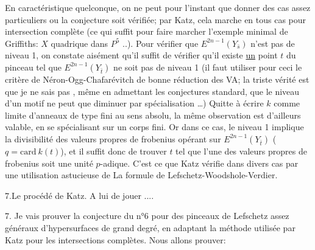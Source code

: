 En caractéristique quelconque, on ne peut pour l'instant que donner des cas assez particuliers ou la conjecture soit vérifiée; par Katz, cela marche en tous cas pour  intersection complète (ce qui suffit pour faire marcher l'exemple minimal de Griffiths: $X$ quadrique dans $P^5$ ..).  Pour vérifier que $E^{2n-1}(Y_{\bar s})$ n'est pas de niveau 1, on constate aisément qu'il suffit de vérifier qu'il existe \uline{un} point $t$ du pinceau tel que $E^{2n-1}(Y_{\bar t})$ ne soit pas de niveau 1 (il faut utiliser pour ceci le critère de Néron-Ogg-Chafarévitch de bonne réduction des VA; la triste vérité est que je ne sais pas , même en  admettant les conjectures standard, que le niveau d'un motif ne peut que diminuer par spécialisation \ldots) Quitte à écrire $k$ comme limite d'anneaux de type fini au sens absolu, la même observation est d'ailleurs valable, en se spécialisant sur un corps fini. Or dans ce cas, le niveau 1 implique la divisibilité  des valeurs propres de frobenius opérant sur $E^{2n-1}(Y_{\bar t})$  ($q=\mathrm{card}\ k(t)$), et il suffit donc de trouver $t$ tel que l'une des valeurs propres de frobenius soit une unité $p$-adique. C'est ce que Katz vérifie dans divers cas par une utilisation astucieuse de La formule de Lefschetz-Woodshole-Verdier.

7.\quad Le procédé de Katz. A lui de jouer ....

7. Je vais prouver la conjecture du n°6 pour des pinceaux de Lefschetz  assez généraux d'hypersurfaces de grand degré, en adaptant la méthode utilisée par Katz pour les intersections complètes. Nous allons prouver:

